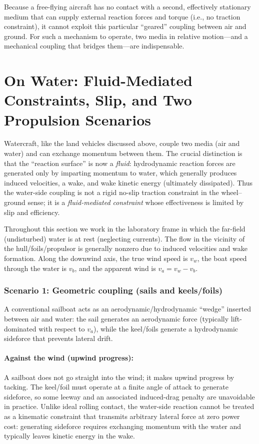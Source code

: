 \documentclass[reprint,aps,pra,longbibliography]{revtex4-2}
\begin{document}
Because a free-flying aircraft has no contact with a second, effectively stationary medium that can supply external reaction forces and torque (i.e., no traction constraint), it cannot exploit this particular ``geared'' coupling between air and ground.
For such a mechanism to operate, two media in relative motion---and a mechanical coupling that bridges them---are indispensable.


\section{On Water: Fluid-Mediated Constraints, Slip, and Two Propulsion Scenarios}
\label{sec:water-sail-prop}

Watercraft, like the land vehicles discussed above, couple two media (air and
water) and can exchange momentum between them.  The crucial distinction is that
the ``reaction surface'' is now a \emph{fluid}: hydrodynamic reaction forces are
generated only by imparting momentum to water, which generally produces induced
velocities, a wake, and wake kinetic energy (ultimately dissipated).  Thus the
water-side coupling is not a rigid no-slip traction constraint in the
wheel--ground sense; it is a \emph{fluid-mediated constraint} whose effectiveness
is limited by slip and efficiency.

Throughout this section we work in the laboratory frame in which the far-field
(undisturbed) water is at rest (neglecting currents). The flow in the vicinity
of the hull/foils/propulsor is generally nonzero due to induced velocities and
wake formation. Along the downwind axis, the true wind speed is $v_w$, the boat
speed through the water is $v_b$, and the apparent wind is
\(
v_a = v_w - v_b
\).

\subsubsection{Scenario 1: Geometric coupling (sails and keels/foils)}

A conventional sailboat acts as an aerodynamic/hydrodynamic ``wedge'' inserted
between air and water: the sail generates an aerodynamic force (typically
lift-dominated with respect to $v_a$), while the keel/foils generate a
hydrodynamic sideforce that prevents lateral drift.

\paragraph*{Against the wind (upwind progress):}
A sailboat does not go straight into the wind; it makes upwind progress by
tacking.  The keel/foil must operate at a finite angle of attack to generate
sideforce, so some leeway and an associated induced-drag penalty are unavoidable
in practice.  Unlike ideal rolling contact, the water-side reaction cannot be
treated as a kinematic constraint that transmits arbitrary lateral force at
zero power cost: generating sideforce requires exchanging momentum with the
water and typically leaves kinetic energy in the wake.
\end{document}
